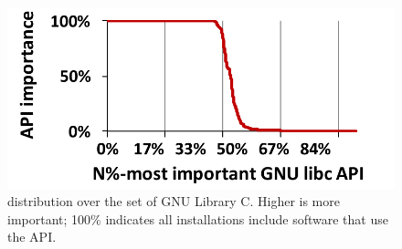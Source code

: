 

\begin{figure}[t]
\centering
\includegraphics[width=0.9\linewidth]{syspop/figures/libc-popularity.pdf}
\caption{\usagemetric{} distribution over the set of GNU Library C. Higher is more important; 100\% indicates all installations include software that use the \libc{} API. }
\label{fig:libc-popularity}
\end{figure}



